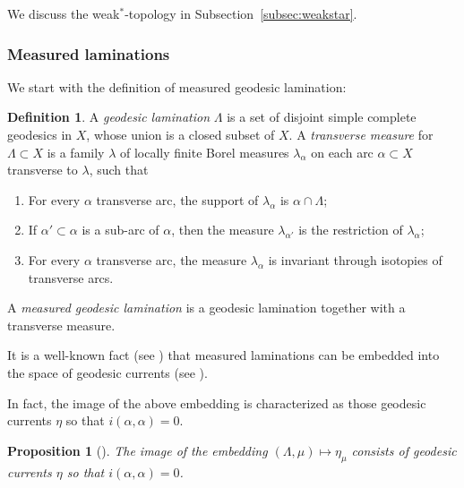 \documentclass[12pt,article]{amsart}
\numberwithin{equation}{section}
\numberwithin{figure}{section}
\newtheorem{proposition}[equation]{Proposition}
\theoremstyle{definition}
\newtheorem{definition}[equation]{Definition}
\theoremstyle{plain}
\begin{document}
We discuss the weak$^*$-topology in Subsection~\ref{subsec:weakstar}.


\subsubsection{Measured laminations}

We start with the definition of measured geodesic lamination:
\begin{definition}
A \emph{geodesic lamination} $\Lambda$ is a set of disjoint simple complete geodesics in $X$, whose union is a closed subset of $X$. A \emph{transverse measure} for $\Lambda \subset X$ is a family $\lambda$ of locally finite Borel measures ${\lambda}_\alpha$ on each arc $\alpha \subset X$ transverse to $\lambda$, such that
\begin{enumerate}
\item For every $\alpha$ transverse arc, the support of $\lambda_\alpha$ is $\alpha \cap \Lambda$;
    \item If $\alpha' \subset \alpha$ is a sub-arc of $\alpha$, then the measure $\lambda_{\alpha'}$ is the restriction of $\lambda_\alpha$;
    \item For every $\alpha$ transverse arc, the measure $\lambda_\alpha$ is invariant through isotopies of transverse arcs.
\end{enumerate}

A \emph{measured geodesic lamination} is a geodesic lamination together with a transverse measure.
\label{def:lam}
\end{definition}

 It is a well-known fact (see \cite[Proposition~17]{Bonahon88:GeodesicCurrent}) that measured laminations can be embedded into the space of geodesic currents (see {\cite[Lemma~4.4]{AL17:HyperbolicStructures}}).


 In fact, the image of the above embedding is characterized as those geodesic currents $\eta$ so that $i(\alpha,\alpha)=0$.

 \begin{proposition}[{\cite[Proposition~14]{Bonahon88:GeodesicCurrent}}]
  The image of the embedding $(\Lambda,\mu) \mapsto \eta_{\mu}$ consists of geodesic currents $\eta$ so that $i(\alpha,\alpha)=0$.
  \label{prop:lamselfzero}
 \end{proposition}
\end{document}
